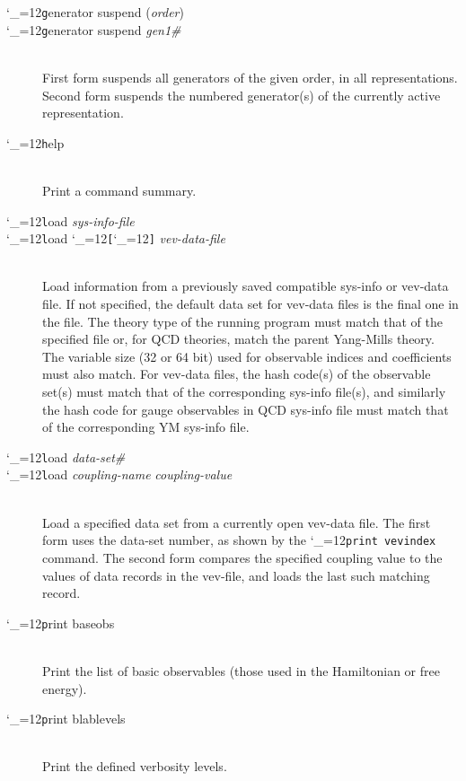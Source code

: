 \documentclass [12pt]{article}
\makeatletter
\renewcommand{\tt}{\begingroup\catcode`_=12\def\_{\string_}\tt@}
\newcommand{\tt@}[1]{\texttt{#1}\endgroup}
\makeatother
\begin{document}
\begin{description}
\item [\tt generator suspend ({\it order})] \bgroup\itemsep 0pt \parskip 0pt
\item [\tt generator suspend {\it{gen1\#}} {\tt{[}}{\it gen2\#}{\tt{]}} $\cdots$ ]~\\
    First form suspends all generators of the given order, in all representations.
    Second form suspends the numbered generator(s) of the currently active representation.
\egroup

\item [\tt help]~\\
    Print a command summary.

\item [\tt load {\it sys-info-file}] \bgroup \itemsep 0pt \parskip 0pt
\item [\tt load \tt{[}{\it data-set\#}\tt{]} {\it vev-data-file}]~\\
    Load information from a previously saved compatible sys-info or vev-data file.
    If not specified, the default data set for vev-data files is the final one
    in the file.
    The theory type of the running program must match that of the specified file
    or, for QCD theories, match the parent Yang-Mills theory.
    The variable size (32 or 64 bit) used for observable indices and coefficients
    must also match.
    For vev-data files, the hash code(s) of the observable set(s)
    must match that of the corresponding sys-info file(s), and similarly
    the hash code for gauge observables in QCD sys-info file must match
    that of the corresponding YM sys-info file.
\egroup

\item [\tt load {\it data-set\#}] \bgroup \itemsep 0pt \parskip 0pt
\item [\tt load {\it coupling-name} {\it coupling-value}]~\\
    Load a specified data set from a currently open vev-data file.
    The first form uses the data-set number, as shown by the
    \tt{print vevindex} command.
    The second form compares the specified coupling value to the
    values of data records in the vev-file, and loads the last
    such matching record.
\egroup

\item [\tt print baseobs]~\\
    Print the list of basic observables (those used in the
    Hamiltonian or free energy).

\item [\tt print blablevels]~\\
    Print the defined verbosity levels.


\end{description}
\end{document}
